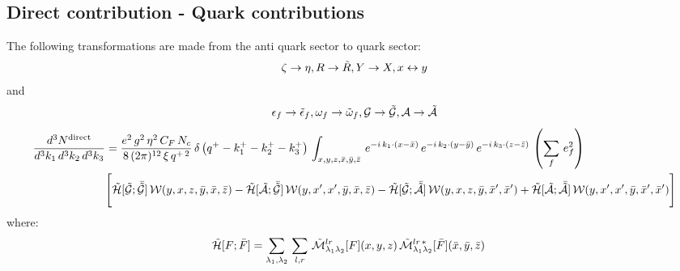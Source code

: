 \documentclass[9pt]{article}
\numberwithin{equation}{section}
\begin{document}
\subsection{Direct contribution - Quark contributions}
The following transformations are made from the anti quark sector to quark sector: \
$$\zeta\rightarrow \eta, R\rightarrow \Tilde{R}, Y \rightarrow X, x\leftrightarrow y$$
and 
$$\epsilon_{f}\rightarrow \Tilde{\epsilon}_{f}, \omega_{f}\rightarrow \Tilde{\omega}_{f}, \mathcal{G} \rightarrow \mathcal{\Tilde{G}}, \mathcal{A} \rightarrow \mathcal{\Tilde{A}}$$
\begin{align}
     \frac{d^{3}N^{\text{direct}}}{d^{3}k_{1}\,d^{3}k_{2}\, d^{3}k_{3}} & = \frac{e^{2}\,g^{2}\,\eta^{2}\,C_{F}\,N_{c}}{8\, (2\pi)^{12}\,\xi\,q^{+\,2}}\, \delta\left(q^{+}-k^{+}_{1}-k^{+}_{2}-k^{+}_{3}\right)\, \int_{x,y,z,\Bar{x},\Bar{y},\Bar{z}}\, e^{-i\,k_{1}\cdot (x-\Bar{x})}\, e^{-i\,k_{2}\cdot (y-\Bar{y})}\, e^{-i\,k_{3}\cdot (z-\Bar{z})}\,\left(\sum_{f}\, e^{2}_{f}\right)\notag \\ & \Bigg[\mathcal{\Tilde{H}}[\mathcal{\Tilde{G}};\mathcal{\Bar{\Tilde{G}}}]\,\mathcal{W}(y,x,z,\Bar{y},\Bar{x},\Bar{z}) - \mathcal{\Tilde{H}}[\mathcal{\Tilde{A}};\mathcal{\Bar{\Tilde{G}}}]\,\mathcal{W}(y,x',x',\Bar{y},\Bar{x},\Bar{z})-\mathcal{\Tilde{H}}[\mathcal{\Tilde{G}};\mathcal{\Bar{\Tilde{A}}}]\,\mathcal{W}(y,x,z,\Bar{y},\Bar{x}',\Bar{x}')+ \mathcal{\Tilde{H}}[\mathcal{\Tilde{A}};\mathcal{\Bar{\Tilde{A}}}]\,\mathcal{W}(y,x',x',\Bar{y},\Bar{x}',\Bar{x}')\Bigg]
\end{align}
where:
\begin{align}
    \mathcal{\Tilde{H}}[F;\Bar{F}] & = \sum_{\lambda_{1},\lambda_{2}}\, \sum_{l,r}\, \mathcal{\Tilde{M}}^{lr}_{\lambda_{1}\lambda_{2}}[F](x,y,z)\, \mathcal{\Tilde{M}}^{lr\,*}_{\lambda_{1}\lambda_{2}}[\Bar{F}](\Bar{x},\Bar{y},\Bar{z})
\end{align}
\end{document}
